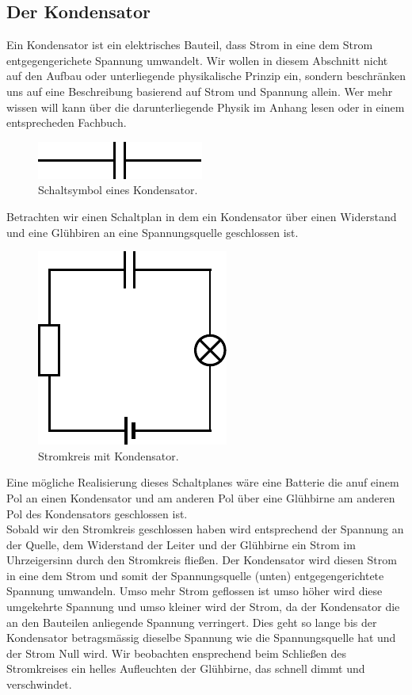 \documentclass[11pt,a4paper,leqno]{report}
\numberwithin{equation}{chapter}
\begin{document}
\subsection{Der Kondensator}
 Ein Kondensator ist ein elektrisches Bauteil, dass Strom in eine dem Strom entgegengerichete Spannung umwandelt. Wir wollen in diesem Abschnitt nicht auf den Aufbau oder unterliegende physikalische Prinzip ein, sondern beschr\"anken uns auf eine Beschreibung basierend auf Strom und Spannung allein. Wer mehr wissen will kann \"uber die darunterliegende Physik im Anhang lesen oder in einem entsprecheden Fachbuch.
  \begin{figure}[H]
 	\begin{center}
 		\includegraphics[scale=0.8]{kondens.pdf}
 		\caption{Schaltsymbol eines Kondensator.}
 	\end{center}
 \end{figure}
 \noindent
 Betrachten wir einen Schaltplan in dem ein Kondensator \"uber einen Widerstand und eine Gl\"uhbiren an eine Spannungsquelle geschlossen ist. 
 \begin{figure}[H]
 	\begin{center}
 		\includegraphics[scale=0.8]{kondensator.pdf}
 		\caption{Stromkreis mit Kondensator.}
 	\end{center}
 \end{figure}
 \noindent
 Eine m\"ogliche Realisierung dieses Schaltplanes w\"are eine Batterie die anuf einem Pol an einen Kondensator und am anderen Pol \"uber eine Gl\"uhbirne am anderen Pol des Kondensators geschlossen ist.\\
 Sobald wir den Stromkreis geschlossen haben wird entsprechend der Spannung an der Quelle, dem Widerstand der Leiter und der Gl\"uhbirne ein Strom im Uhrzeigersinn durch den Stromkreis flie\ss{}en. Der Kondensator wird diesen Strom in eine dem Strom und somit der Spannungsquelle (unten) entgegengerichtete Spannung umwandeln. Umso mehr Strom geflossen ist umso h\"oher wird diese umgekehrte Spannung und umso kleiner wird der Strom, da der Kondensator die an den Bauteilen anliegende Spannung verringert. Dies geht so lange bis der Kondensator betragsm\"assig dieselbe Spannung wie die Spannungsquelle hat und der Strom Null wird. Wir beobachten ensprechend beim Schlie\ss{}en des Stromkreises ein helles Aufleuchten der Gl\"uhbirne, das schnell dimmt und verschwindet.\\
\end{document}

